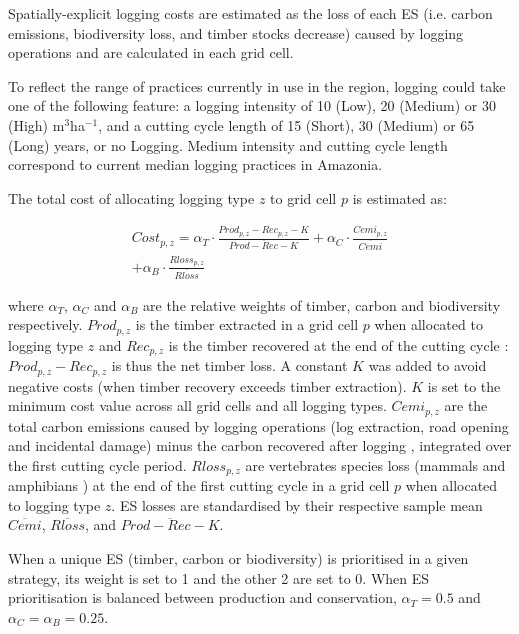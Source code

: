 \documentclass{article}
\begin{document}
Spatially-explicit logging costs are estimated as the loss of each ES (i.e. carbon emissions, biodiversity loss, and timber stocks decrease) caused by logging operations and are calculated in each grid cell.

To reflect the range of practices currently in use in the region, logging could take one of the following feature: a logging intensity of 10 (Low), 20 (Medium) or 30 (High) m$^3$ha$^{−1}$, and a cutting cycle length of 15 (Short), 30 (Medium) or 65 (Long) years, or no Logging. Medium intensity and cutting cycle length correspond to current median logging practices in Amazonia. 

The total cost of allocating logging type $z$ to grid cell $p$ is estimated as: 

\begin{equation}
\begin{split}
    Cost_{p,z} = \alpha _T \cdot \frac{Prod_{p,z} - Rec_{p,z} - K}{\overline{Prod - Rec - K}} + \alpha _C \cdot \frac{Cemi_{p,z}}{\overline{Cemi} } \\ + \alpha _B \cdot \frac{Rloss_{p,z}}{\overline{Rloss}} 
\end{split}
\end{equation}

where $\alpha_T$, $\alpha_C$ and $\alpha_B$ are the relative weights of timber, carbon and biodiversity respectively. 
$Prod_{p,z}$ is the timber extracted in a grid cell $p$ when allocated to logging type $z$ and $Rec_{p,z}$ is the timber recovered at the end of the cutting cycle \cite{Piponiotc}: $Prod_{p,z} - Rec_{p,z}$ is thus the net timber loss. A constant $K$ was added to avoid negative costs (when timber recovery exceeds timber extraction). $K$ is set to the minimum cost value across all grid cells and all logging types. 
$Cemi_{p,z}$ are the total carbon emissions caused by logging operations (log extraction, road opening and incidental damage) minus the carbon recovered after logging \cite{Piponiot2016a}, integrated over the first cutting cycle period.
$Rloss_{p,z}$ are vertebrates species loss (mammals and amphibians \cite{Jenkins2013}) at the end of the first cutting cycle in a grid cell $p$ when allocated to logging type $z$. 
ES losses are standardised by their respective sample mean $\overline{Cemi}$, $\overline{Rloss}$, and $\overline{Prod-Rec-K}$. 


When a unique ES (timber, carbon or biodiversity) is prioritised in a given strategy, its weight is set to 1 and the other 2 are set to 0. When ES prioritisation is balanced between production and conservation, $\alpha_T = 0.5$ and $\alpha_C = \alpha_B = 0.25$.
\end{document}
